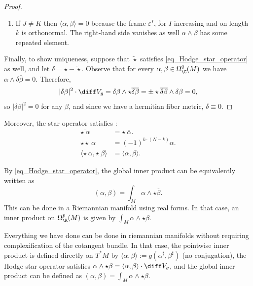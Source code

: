 \begin{proof}
\begin{enumerate}
        \item If \(J \neq K\) then \(\langle \alpha, \beta \rangle = 0 \) because the frame \(\varepsilon^I\), for \(I\) increasing and on length \(k\) is orthonormal. The right-hand side vanishes as well \(\alpha \wedge \beta\) has some repeated element.
    \end{enumerate}
    Finally, to show uniqueness, suppose that \(\tilde{\star}\) satisfies \eqref{eq_Hodge_star_operator} as well, and let \(\delta=\star-\tilde{\star}\). Observe that for every \(\alpha, \beta \in \Omega_\C^q(M)\) we have \(\alpha \wedge \delta \overline{\beta}=0\). Therefore,
    \[
    |\delta \beta |^2 \cdot \diff V_g = \delta \beta \wedge \star \overline{\delta \beta}= \pm \star \overline{\delta \beta} \wedge \delta\beta=0,
    \]
    so \(|\delta \beta |^2=0\) for any \(\beta\), and since we have a hermitian fiber metric, \(\delta \equiv 0.\)
\end{proof}

Moreover, the star operator satisfies \parencite[Prop. 9.8]{lee_introCM}:
\begin{align}
        \overline{\star \  \alpha} &= \star \ \overline{\alpha}. \\
        \star \star \ \alpha & = (-1)^{k\cdot (N-k)} \alpha. \\
        \langle \star \ \alpha, \star \ \beta \rangle & = \langle \alpha, \beta \rangle.
\end{align}

By \eqref{eq_Hodge_star_operator}, the global inner product can be equivalently written as
\begin{equation} \label{eq_Hodge_inner_prod_def_2}
    (\alpha, \beta)=\int_M \alpha \wedge \star \overline{\beta}. 
\end{equation}
This can be done in a Riemannian manifold using real forms. In that case, an inner product on \(\Omega_\R^p(M)\) is given by \(\int_M \alpha \wedge \star \beta\).

\begin{obs}
    Everything we have done can be done in riemannian manifolds without requiring complexification of the cotangent bundle. In that case, the pointwise inner product is defined directly on \(T^*M\) by \(\langle\alpha, \beta\rangle:=g(\alpha^\sharp, \beta^\sharp)\) (no conjugation), the Hodge star operator satisfies \(\alpha \wedge \star \beta = \langle \alpha, \beta \rangle \cdot \diff V_g\), and the global inner product can be defined as \((\alpha, \beta)=\int_M \alpha \wedge \star \beta\).
\end{obs}

